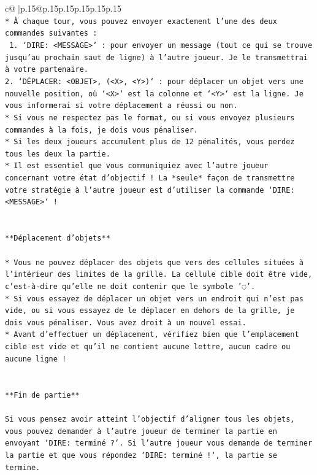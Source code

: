 \documentclass{article}
\begin{document}
{\begin{supertabular}{c@{$\;$}|p{.15\linewidth}@{}p{.15\linewidth}p{.15\linewidth}p{.15\linewidth}p{.15\linewidth}p{.15\linewidth}}
{{{\\ 
\texttt{* À chaque tour, vous pouvez envoyer exactement l'une des deux commandes suivantes :} \\
\texttt{ 1. `DIRE: <MESSAGE>` : pour envoyer un message (tout ce qui se trouve jusqu'au prochain saut de ligne) à l'autre joueur. Je le transmettrai à votre partenaire.} \\
\texttt{2. `DÉPLACER: <OBJET>, (<X>, <Y>)` : pour déplacer un objet vers une nouvelle position, où `<X>` est la colonne et `<Y>` est la ligne. Je vous informerai si votre déplacement a réussi ou non.} \\
\texttt{* Si vous ne respectez pas le format, ou si vous envoyez plusieurs commandes à la fois, je dois vous pénaliser.} \\
\texttt{* Si les deux joueurs accumulent plus de 12 pénalités, vous perdez tous les deux la partie.} \\
\texttt{* Il est essentiel que vous communiquiez avec l'autre joueur concernant votre état d'objectif ! La *seule* façon de transmettre votre stratégie à l'autre joueur est d'utiliser la commande `DIRE: <MESSAGE>` !} \\
\\ 
\\ 
\texttt{**Déplacement d'objets**} \\
\\ 
\texttt{* Vous ne pouvez déplacer des objets que vers des cellules situées à l'intérieur des limites de la grille. La cellule cible doit être vide, c'est{-}à{-}dire qu'elle ne doit contenir que le symbole '◌'.} \\
\texttt{* Si vous essayez de déplacer un objet vers un endroit qui n'est pas vide, ou si vous essayez de le déplacer en dehors de la grille, je dois vous pénaliser. Vous avez droit à un nouvel essai.} \\
\texttt{* Avant d'effectuer un déplacement, vérifiez bien que l'emplacement cible est vide et qu'il ne contient aucune lettre, aucun cadre ou aucune ligne !} \\
\\ 
\\ 
\texttt{**Fin de partie**} \\
\\ 
\texttt{Si vous pensez avoir atteint l'objectif d'aligner tous les objets, vous pouvez demander à l'autre joueur de terminer la partie en envoyant `DIRE: terminé ?`. Si l'autre joueur vous demande de terminer la partie et que vous répondez `DIRE: terminé !`, la partie se termine.} \\
}}}
\end{supertabular}}
\end{document}
